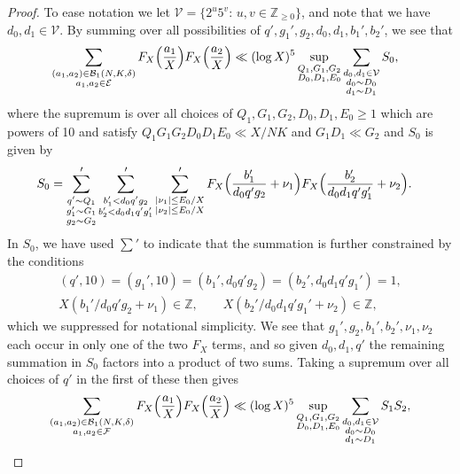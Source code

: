 \documentclass[10pt]{amsart}
\theoremstyle{plain}
\numberwithin{sblmm}{thrm}
\numberwithin{equation}{section}
\begin{document}
\begin{proof}
 To ease notation we let $\mathcal{V}=\{2^u5^v:\,u,v\in\mathbb{Z}_{\ge 0}\}$, and note that we have $d_0,d_1\in\mathcal{V}$. By summing over all possibilities of $q',g_1',g_2,d_0,d_1,b_1',b_2'$, we see that
\begin{align*}
&\sum_{\substack{(a_1,a_2)\in\mathcal{B}_1(N,K,\delta) \\ a_1,a_2\in\mathcal{E} }}F_X\Bigl(\frac{a_1}{X}\Bigr)F_X\Bigl(\frac{a_2}{X}\Bigr)\ll (\log{X})^5\sup_{\substack{Q_1,G_1,G_2\\ D_0,D_1,E_0}} \sum_{\substack{d_0,d_1\in\mathcal{V}\\ d_0\sim D_0\\ d_1\sim D_1}}S_0,
\end{align*}
%
 where the supremum is over all choices of $Q_1,G_1,G_2,D_0,D_1,E_0\ge 1$ which are powers of 10 and satisfy $Q_1G_1G_2D_0D_1E_0\ll X/N K$ and $G_1D_1\ll G_2$ and $S_0$ is given by
%
\begin{align*}
S_0&=\sum'_{\substack{q'\sim Q_1 \\ g_1'\sim G_1 \\ g_2\sim G_2}}\sum'_{\substack{b_1'<d_0q' g_2 \\ b_2'<d_0d_1 q' g_1'}}\sum'_{\substack{|\nu_1|\le E_0/X\\ |\nu_2|\le E_0/X}}F_{X}\Bigl(\frac{b_1'}{d_0 q' g_2}+\nu_1\Bigr)F_{X}\Bigl(\frac{b_2'}{d_0 d_1 q' g_1'}+\nu_2\Bigr).
\end{align*}
%
In $S_0$, we have used $\sum'$ to indicate that the summation is further constrained by the conditions
%
\begin{align*}
(q',10)=(g_1',10)=(b_1',d_0q' g_2)=(b_2',d_0d_1q' g_1')=1,\\
X(b_1'/d_0 q' g_2+\nu_1)\in\mathbb{Z},\qquad X(b_2'/d_0 d_1 q' g_1'+\nu_2)\in\mathbb{Z},
\end{align*}
%
which we suppressed for notational simplicity. We see that $g_1',g_2,b_1',b_2',\nu_1,\nu_2$ each occur in only one of the two $F_X$ terms, and so given $d_0,d_1,q'$ the remaining summation in $S_0$ factors into a product of two sums. Taking a supremum over all choices of $q'$ in the first of these then gives
\begin{equation}
\sum_{\substack{(a_1,a_2)\in\mathcal{B}_1(N,K,\delta) \\ a_1,a_2\in\mathcal{F} }}F_X\Bigl(\frac{a_1}{X}\Bigr)F_X\Bigl(\frac{a_2}{X}\Bigr)\ll (\log{X})^5\sup_{\substack{Q_1,G_1,G_2\\ D_0,D_1,E_0}}\sum_{\substack{d_0,d_1\in\mathcal{V}\\ d_0\sim D_0\\ d_1\sim D_1}} S_1S_2,

\end{equation}
\end{proof}
\end{document}
